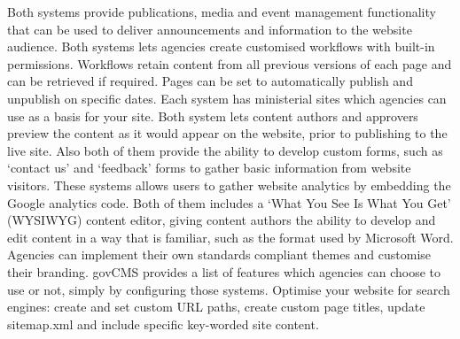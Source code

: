 Both systems provide publications, media and event management functionality that can be used to deliver announcements and information to the website audience. Both systems lets agencies create customised workflows with built-in permissions. Workflows retain content from all previous versions of each page and can be retrieved if required. Pages can be set to automatically publish and unpublish on specific dates. Each system has ministerial sites which agencies can use as a basis for your site. Both system lets content authors and approvers preview the content as it would appear on the website, prior to publishing to the live site. Also both of them provide the ability to develop custom forms, such as ‘contact us’ and ‘feedback’ forms to gather basic information from website visitors. These systems allows users to gather website analytics by embedding the Google analytics code. Both of them includes a ‘What You See Is What You Get’ (WYSIWYG) content editor, giving content authors the ability to develop and edit content in a way that is familiar, such as the format used by Microsoft Word. Agencies can implement their own standards compliant themes and customise their branding. govCMS provides a list of features which agencies can choose to use or not, simply by configuring those systems. Optimise your website for search engines: create and set custom URL paths, create custom page titles, update sitemap.xml and include specific key-worded site content.
